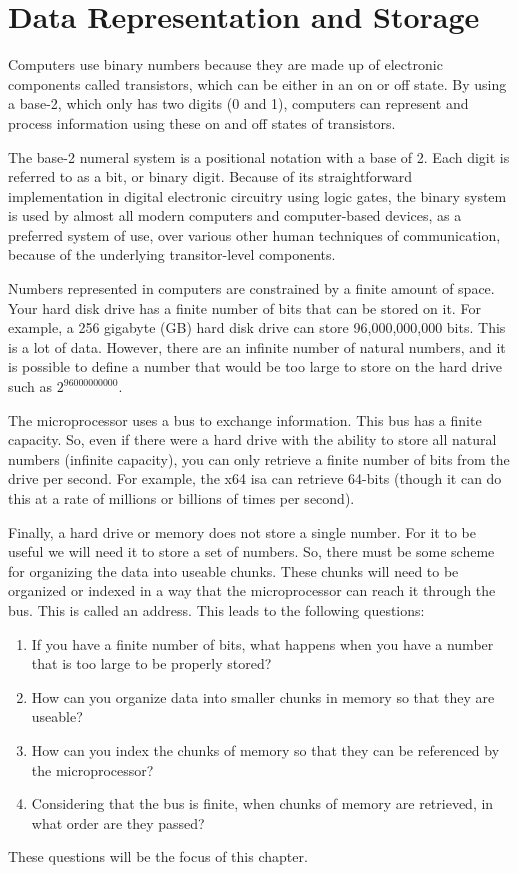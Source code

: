 \chapter{Data Representation and Storage\label{sec:data}}
\setcounter{examples}{1}

Computers use binary numbers because they are made up of electronic components called transistors, 
which can be either in an on or off state. By using a \gls{base-2}, which only 
has two digits (0 and 1), computers can represent and process information using these on and 
off states of transistors.

The \gls{base-2} numeral system is a positional notation with a base of 2. Each digit is referred to as 
a \gls{bit}, or binary digit. Because of its straightforward implementation in digital electronic 
circuitry using logic gates, the binary system is used by almost all modern computers and 
computer-based devices, as a preferred system of use, over various other human techniques of 
communication, because of the underlying transitor-level components.

Numbers represented in computers are constrained by a finite amount of space. Your hard disk drive 
has a finite number of bits that can be stored on it. For example, a 256 gigabyte (GB) hard disk drive 
can store 96,000,000,000 bits. This is a lot of data. However, there are an infinite number of natural
numbers, and it is possible to define a number that would be too large to store on the hard drive such as 
$2^{96000000000}$.

The microprocessor uses a bus to exchange information. This bus has a finite capacity. So, even if 
there were a hard drive with the ability to store all natural numbers (infinite capacity), you can 
only retrieve a finite number of bits from the drive per second. For example, the \gls{x64} \gls{isa} 
can retrieve 64-bits (though it can do this at a rate of millions or billions of times per second).

Finally, a hard drive or memory does not store a single number. For it to be useful we will need it 
to store a set of numbers. So, there must be 
some scheme for organizing the data into useable chunks. These chunks will need to be organized or 
indexed in a way that the microprocessor can reach it through the bus. This is called an \gls{address}. 
This leads to the following questions:
%
\begin{enumerate}
    \item If you have a finite number of bits, what happens when you have a number that is too large to be properly stored?
    \item How can you organize data into smaller chunks in memory so that they are useable?
    \item How can you index the chunks of memory so that they can be referenced by the microprocessor?
    \item Considering that the bus is finite, when chunks of memory are retrieved, in what order are they passed?
\end{enumerate}
%
These questions will be the focus of this chapter. 



